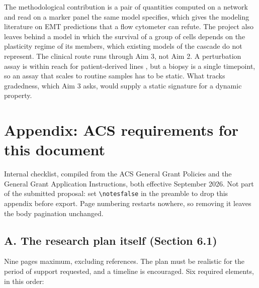 \documentclass[12pt,letterpaper]{article}
\newif\ifnotes
\newcommand{\chg}[1]{\textcolor{chgcolor}{#1}}
\newcommand{\chg}[1]{#1}
\begin{document}
The methodological contribution is a pair of quantities computed on a network and read on a marker panel the same model specifies, which gives the modeling literature on EMT predictions that a flow cytometer can refute. The project also leaves behind a model in which the survival of a group of cells depends on the plasticity regime of its members, which existing models of the cascade do not represent. The clinical route runs through Aim 3, not Aim 2. A perturbation assay is within reach for patient-derived lines \cite{brown2022}, but a biopsy is a single timepoint, so an assay that scales to routine samples has to be static. \chg{What tracks} gradedness, which Aim 3 asks, would supply a static signature for a dynamic property.

\clearpage
\small


\ifnotes
\clearpage
\section*{Appendix: ACS requirements for this document}
\small

Internal checklist, compiled from the ACS General Grant Policies and the General
Grant Application Instructions, both effective September 2026. Not part of the
submitted proposal: set \texttt{\textbackslash notesfalse} in the preamble to
drop this appendix before export. Page numbering restarts nowhere, so removing
it leaves the body pagination unchanged.

\subsection*{A. The research plan itself (Section 6.1)}

Nine pages maximum, excluding references. The plan must be realistic for the
period of support requested, and a timeline is encouraged. Six required
elements, in this order:
\end{document}
